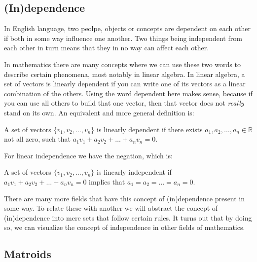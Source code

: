 \subsection{(In)dependence}

In English language, two peolpe, objects or concepts are dependent on each other if both in some way influence one another. Two things being independent from each other in turn means that they in no way can affect each other. 

    In mathematics there are many concepts where we can use these two words to describe certain phenomena, most notably in linear algebra. In linear algebra, a set of vectors is linearly dependent if you can write one of its vectors as a linear combination of the others. Using the word dependent here makes sense, because if you can use all others to build that one vector, then that vector does not \textit{really} stand on its own. An equivalent and more general definition is:


    \begin{defn}

    A set of vectors $\{v_1,v_2,\dots,v_n\}$ is linearly dependent if there exists $a_1,a_2,\dots,a_n \in \mathbb{R} $ not all zero, such that $a_1v_1+a_2v_2+\dots +a_nv_n = 0.$
    
    \end{defn}




For linear independence we have the negation, which is:
\begin{defn}
    A set of vectors $ \{v_1,v_2,\dots,v_n\}$ is linearly independent if $a_1v_1+a_2v_2+\dots+a_nv_n=0$ implies that $a_1=a_2=\dots=a_n=0.$

\end{defn}
There are many more fields that have this concept of (in)dependence present in some way. To relate these with another we will abstract the concept of (in)dependence into mere sets that follow certain rules. It turns out that by doing so, we can visualize the concept of independence in other fields of mathematics.








\subsection{Matroids}

